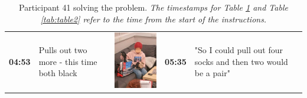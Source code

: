 \documentclass[twocolumn, issue, empirical, authordate,drafn]{jote-new-article}
\begin{document}
\begin{table}[ht!] 
\caption{Participant 41 solving the problem. \hspace{\textwidth}
\emph{The timestamps for Table \ref{tab:table1} and Table \ref{tab:table2} refer to the time from the start of the instructions. }}
\label{tab:table1}
\renewcommand{\arraystretch}{2.5}
\begin{tabularx}{\linewidth}{@{} m{.05\linewidth} m{.2\linewidth} >{\raggedleft\arraybackslash}m{.19\linewidth}  m{.05\linewidth} m{.2\linewidth} >{\raggedleft\arraybackslash}m{.19\linewidth} }
\textbf{04:53}  &  Pulls out two more - this time both black  &  \includegraphics[height=.15\textheight, width=.8\linewidth]{media/image5.png}  &
 \textbf{05:35} & "So I could pull out four socks and then two would be a pair" & 

\end{tabularx}
\end{table}
\end{document}
